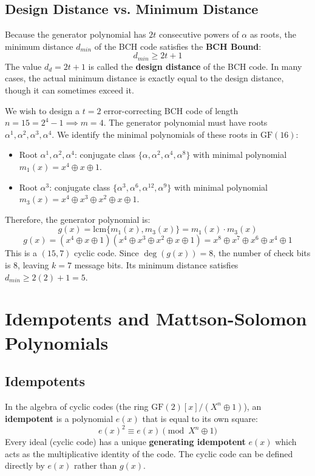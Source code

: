\documentclass[12pt,a4paper]{article}
\begin{document}
\subsection{Design Distance vs. Minimum Distance}
Because the generator polynomial has $2t$ consecutive powers of $\alpha$ as roots, the minimum distance $d_{min}$ of the BCH code satisfies the \textbf{BCH Bound}:
\[ d_{min} \ge 2t + 1 \]
The value $d_d = 2t + 1$ is called the \textbf{design distance} of the BCH code. In many cases, the actual minimum distance is exactly equal to the design distance, though it can sometimes exceed it.

\begin{tcolorbox}[examplebox, title={\textbf{Design of a 2-Error Correcting BCH Code of Length $n=15$}}]
We wish to design a $t=2$ error-correcting BCH code of length $n = 15 = 2^4 - 1 \implies m=4$.
The generator polynomial must have roots $\alpha^1, \alpha^2, \alpha^3, \alpha^4$.
We identify the minimal polynomials of these roots in $\text{GF}(16)$:
\begin{itemize}[leftmargin=*, itemsep=2pt]
  \item Root $\alpha^1, \alpha^2, \alpha^4$: conjugate class $\{\alpha, \alpha^2, \alpha^4, \alpha^8\}$ with minimal polynomial $m_1(x) = x^4 \oplus x \oplus 1$.
  \item Root $\alpha^3$: conjugate class $\{\alpha^3, \alpha^6, \alpha^{12}, \alpha^9\}$ with minimal polynomial $m_3(x) = x^4 \oplus x^3 \oplus x^2 \oplus x \oplus 1$.
\end{itemize}
Therefore, the generator polynomial is:
\[ g(x) = \text{lcm}\{m_1(x), m_3(x)\} = m_1(x) \cdot m_3(x) \]
\[ g(x) = (x^4 \oplus x \oplus 1)(x^4 \oplus x^3 \oplus x^2 \oplus x \oplus 1) = x^8 \oplus x^7 \oplus x^6 \oplus x^4 \oplus 1 \]
This is a $(15, 7)$ cyclic code. Since $\deg(g(x)) = 8$, the number of check bits is $8$, leaving $k = 7$ message bits. Its minimum distance satisfies $d_{min} \ge 2(2) + 1 = 5$.
\end{tcolorbox}

\section{Idempotents and Mattson-Solomon Polynomials}

\subsection{Idempotents}
In the algebra of cyclic codes (the ring $\text{GF}(2)[x] / (X^n \oplus 1)$), an \textbf{idempotent} is a polynomial $e(x)$ that is equal to its own square:
\[ e(x)^2 \equiv e(x) \pmod{X^n \oplus 1} \]
Every ideal (cyclic code) has a unique \textbf{generating idempotent} $e(x)$ which acts as the multiplicative identity of the code. The cyclic code can be defined directly by $e(x)$ rather than $g(x)$.
\end{document}
